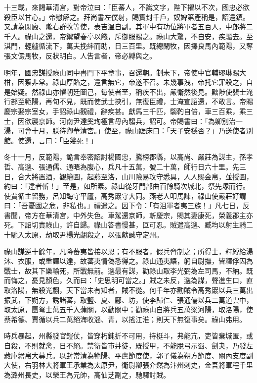 \begin{pinyinscope}
 十三載，來謁華清宮，對帝泣曰：「臣蕃人，不識文字，陛下擢以不次，國忠必欲殺臣以甘心。」帝慰解之。拜尚書左僕射，賜實封千戶，奴婢第產稱是，詔還鎮。又請為閑廄、隴右群牧等使，表吉溫自副。其軍中有功位將軍者五百人，中郎將二千人。祿山之還，帝禦望春亭以餞，斥御服賜之。祿山大驚，不自安，疾驅去。至淇門，輕艫循流下，萬夫挽繂而助，日三百里。既總閑牧，因擇良馬內範陽，又奪張文儼馬牧，反狀明白。人告言者，帝必縛與之。



 明年，國忠謀授祿山同中書門下平章事，召還朝。制未下，帝使中官輔璆琳賜大柑，因察非常。祿山厚賂之，還言無它，帝遂不召。未幾事洩，帝托它罪殺之，自是始疑。然祿山亦懼朝廷圖己，每使者至，稱疾不出，嚴衛然後見。黜陟使裴士淹行部至範陽，再旬不見，既而使武士挾引，無復臣禮，士淹宣詔還，不敢言。帝賜慶宗娶宗室女，手詔祿山觀禮，辭疾甚。獻馬三千匹，騶靮自倍，車三百乘，乘三士，因欲襲京師。河南尹達奚珣極言毋內騶兵，詔可。帝賜書曰：「為卿別治一湯，可會十月，朕待卿華清宮。」使至，祿山踞床曰：「天子安穩否？」乃送使者別館。使還，言曰：「臣幾死！」



 冬十一月，反範陽，詭言奉密詔討楊國忠，騰榜郡縣，以高尚、嚴莊為謀主，孫孝哲、高邈、張通儒、通晤為腹心，兵凡十五萬，號二十萬，師行日六十里。先三日，合大將置酒，觀繪圖，起燕至洛，山川險易攻守悉具，人人賜金帛，並授圖，約曰：「違者斬！」至是，如所素。祿山從牙門部曲百餘騎次城北，祭先塚而行。使賈循主留務，呂知誨守平廬，高秀巖守大同。燕老人叩馬諫，祿山使嚴莊好謂曰：「吾憂國之危，非私也。」禮遣之。因下令：「有沮軍者夷三族！」凡七日，反書聞，帝方在華清宮，中外失色。車駕還京師，斬慶宗，賜其妻康死，榮義郡主亦死。下詔切責祿山，許自歸。祿山答書慢甚，叵可忍。賊遣高邈、臧均以射生騎二十馳入太原，劫取尹楊光翽殺之，以張獻誠守定州。



 祿山謀逆十餘年，凡降蕃夷皆接以恩；有不服者，假兵脅制之；所得士，釋縛給湯沐、衣服，或重譯以達，故蕃夷情偽悉得之。祿山通夷語，躬自尉撫，皆釋俘囚為戰士，故其下樂輸死，所戰無前。邈最有謀，勸祿山取李光弼為左司馬，不納。既而悔之，憂見顏色，久而曰：「史思明可當之。」賊之未反，邈為謀，聲進生口，直取洛陽，無殺光翽，天下當未有知者，賊不從。何千年亦勸賊令高秀巖以兵三萬出振武，下朔方，誘諸蕃，取鹽、夏、鄜、坊，使李歸仁、張通儒以兵二萬道雲中，取太原，團弩士萬五千入蒲關，以動關中；勸祿山自將兵五萬梁河陽，取洛陽，使蔡希德、賈循以兵二萬絕海收淄、青，以搖江淮；則天下無復事矣。祿山弗用。



 時兵暴起，州縣發官鎧仗，皆穿朽鈍折不可用，持梃斗，弗能亢，吏皆棄城匿，或自殺，不則就禽，日不絕。禁衛皆市井徒，既授甲，不能脫弓示蜀、劍夬，乃發左藏庫繒帛大募兵。以封常清為範陽、平盧節度使，郭子儀為朔方節度、關內支度副大使，右羽林大將軍王承業為太原尹，衛尉卿張介然為汴州刺史，金吾將軍程千里為潞州長史，以榮王為元帥，高仙芝副之，馳驛討賊。




\end{pinyinscope}
